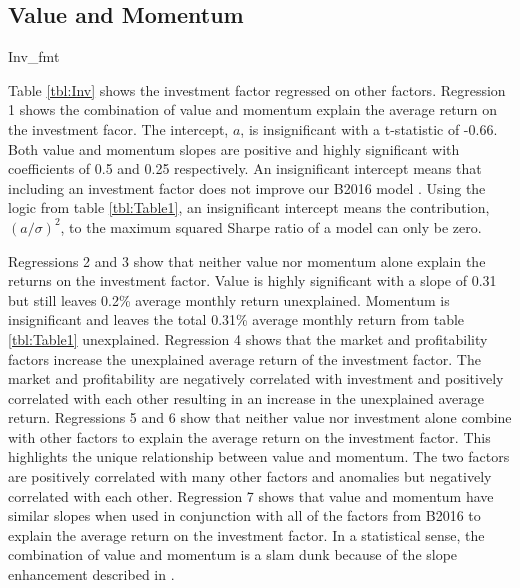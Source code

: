 
\subsection{Value and Momentum}

{Inv_fmt}

Table \ref{tbl:Inv} shows the investment factor regressed on other factors. Regression 1
shows the combination of value and momentum explain the average return on the investment
facor. The intercept, $a$, is insignificant with a t-statistic of -0.66. Both value and
momentum slopes are positive and highly significant with coefficients of 0.5 and 0.25
respectively. An insignificant intercept means that including an investment factor does
not improve our B2016 model \parencite{fama1998determining, barillas2016alpha,
fama2016choosing}. Using the logic from table \ref{tbl:Table1}, an insignificant intercept
means the contribution, $(a/\sigma)^2$, to the maximum squared Sharpe ratio of a model can
only be zero.

Regressions 2 and 3 show that neither value nor momentum alone explain the returns on the
investment factor. Value is highly significant with a slope of 0.31 but still leaves 0.2\%
average monthly return unexplained. Momentum is insignificant and leaves the total 0.31\%
average monthly return from table \ref{tbl:Table1} unexplained. Regression 4 shows that
the market and profitability factors increase the unexplained average return of the
investment factor. The market and profitability are negatively correlated with investment
and positively correlated with each other resulting in an increase in the unexplained
average return. Regressions 5 and 6 show that neither value nor investment alone combine
with other factors to explain the average return on the investment factor. This highlights
the unique relationship between value and momentum. The two factors are positively
correlated with many other factors and anomalies but negatively correlated with each
other. Regression 7 shows that value and momentum have similar slopes when used in
conjunction with all of the factors from B2016 to explain the average return on the
investment factor. In a statistical sense, the combination of value and momentum is a slam
dunk because of the slope enhancement described in \textcite{fama2015incremental}.

